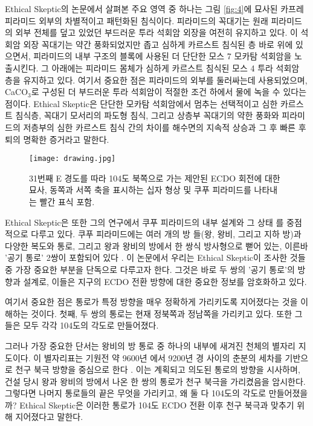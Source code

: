 \documentclass[10pt,twocolumn,letterpaper]{article}
\begin{document}
\begin{개요}
Ethical Skeptic의 논문에서 살펴본 주요 영역 중 하나는 그림 \ref{fig:4}에 묘사된 카프레 피라미드 외부의 차별적이고 패턴화된 침식이다. 피라미드의 꼭대기는 원래 피라미드의 외부 전체를 덮고 있었던 부드러운 투라 석회암 외장을 여전히 유지하고 있다. 이 석회암 외장 꼭대기는 약간 풍화되었지만 좁고 심하게 카르스트 침식된 층 바로 위에 있으면서,  피라미드의 내부 구조의 블록에 사용된 더 단단한 모스 7 모카탐 석회암을 노출시킨다. 그 아래에는 피라미드 몸체가 심하게 카르스트 침식된 모스 4 투라 석회암 층을 유지하고 있다. 여기서 중요한 점은 피라미드의 외부를 둘러싸는데  사용되었으며, CaCO$_3$로 구성된 더 부드러운 투라 석회암이 적절한 조건 하에서 물에 녹을 수 있다는 점이다. Ethical Skeptic은 단단한 모카탐 석회암에서 멈추는 선택적이고 심한 카르스트 침식층, 꼭대기 모서리의 파도형 침식, 그리고 상층부 꼭대기의 약한 풍화와 피라미드의 저층부의 심한 카르스트 침식 간의 차이를 해수면의 지속적 상승과 그 후 빠른 후퇴의 명확한 증거라고 말한다\cite{27}.

\begin{figure*}[t]
\begin{center}
\texttt{[image: drawing.jpg]}
\end{center}                                                                                 
   \caption{31번째 E 경도를 따라 104도 북쪽으로 가는 제안된 ECDO 회전에 대한 묘사, 동쪽과 서쪽 축을 표시하는 십자 형상 및 쿠푸 피라미드를 나타내는 빨간 표식 포함.}
\label{fig:6}
\end{figure*}

Ethical Skeptic은 또한 그의 연구에서 쿠푸 피라미드의 내부 설계와 그 상태 \cite{28}를 중점적으로 다루고 있다. 쿠푸 피라미드에는 여러 개의 방 들(왕, 왕비, 그리고 지하 방)과 다양한 복도와 통로, 그리고 왕과 왕비의 방에서 한 쌍식 방사형으로 뻗어 있는, 이른바  '공기 통로' 2쌍이 포함되어 있다 \cite{29,30}. 이 논문에서 우리는 Ethical Skeptic이 조사한 것들 중 가장 중요한 부분을 단독으로 다루고자 한다. 그것은 바로 두 쌍의 '공기 통로'의 방향과 설계로, 이들은 지구의 ECDO 전환 방향에 대한 중요한 정보를 암호화하고 있다.

여기서 중요한 점은 통로가 특정 방향을 매우 정확하게 가리키도록 지어졌다는 것을 이해하는 것이다. 첫째, 두 쌍의 통로는 현재 정북쪽과 정남쪽을 가리키고 있다. 또한 그들은 모두 각각 104도의 각도로 만들어졌다.

그러나 가장 중요한 단서는 왕비의 방 통로 중 하나의 내부에 새겨진 천체의 별자리 지도이다. 이 별자리표는  기원전 약 9600년 에서 9200년 경 사이의 춘분의 세차를 기반으로 천구 북극 방향을 중심으로 한다 \cite{28}. 이는 계획되고 의도된 통로의 방향을 시사하며, 건설 당시 왕과 왕비의 방에서 나온 한 쌍의 통로가 천구 북극을 가리켰음을 암시한다. 그렇다면 나머지 통로들의 끝은 무엇을 가리키고, 왜 둘 다 104도의 각도로 만들어졌을까? Ethical Skeptic은 이러한 통로가 104도 ECDO 전환 이후 천구 북극과 맞추기 위해 지어졌다고 말한다.


\end{개요}
\end{document}
